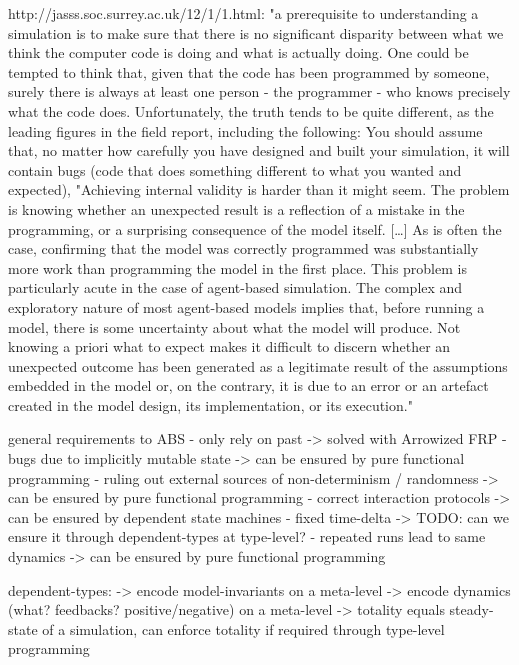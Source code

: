 http://jasss.soc.surrey.ac.uk/12/1/1.html: "a prerequisite to understanding a simulation is to make sure that there is no significant disparity between what we think the computer code is doing and what is actually doing. One could be tempted to think that, given that the code has been programmed by someone, surely there is always at least one person - the programmer - who knows precisely what the code does. Unfortunately, the truth tends to be quite different, as the leading figures in the field report, including the following: You should assume that, no matter how carefully you have designed and built your simulation, it will contain bugs (code that does something different to what you wanted and expected), "Achieving internal validity is harder than it might seem. The problem is knowing whether an unexpected result is a reflection of a mistake in the programming, or a surprising consequence of the model itself. […] As is often the case, confirming that the model was correctly programmed was substantially more work than programming the model in the first place. This problem is particularly acute in the case of agent-based simulation. The complex and exploratory nature of most agent-based models implies that, before running a model, there is some uncertainty about what the model will produce. Not knowing a priori what to expect makes it difficult to discern whether an unexpected outcome has been generated as a legitimate result of the assumptions embedded in the model or, on the contrary, it is due to an error or an artefact created in the model design, its implementation, or its execution."



general requirements to ABS
- only rely on past
	-> solved with Arrowized FRP
- bugs due to implicitly mutable state
	-> can be ensured by pure functional programming
- ruling out external sources of non-determinism / randomness
	-> can be ensured by pure functional programming
- correct interaction protocols
	-> can be ensured by dependent state machines
- fixed time-delta
	-> TODO: can we ensure it through dependent-types at type-level?
- repeated runs lead to same dynamics
	-> can be ensured by pure functional programming

dependent-types:
-> encode model-invariants on a meta-level
-> encode dynamics (what? feedbacks? positive/negative) on a meta-level
-> totality equals steady-state of a simulation, can enforce totality if required through type-level programming